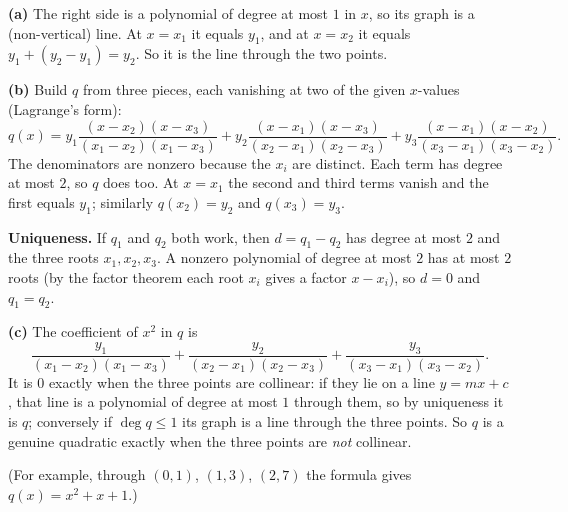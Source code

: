 \textbf{(a)} The right side is a polynomial of degree at most $1$ in $x$, so its graph is a (non-vertical) line. At $x=x_1$ it equals $y_1$, and at $x=x_2$ it equals $y_1+(y_2-y_1)=y_2$. So it is the line through the two points.

\textbf{(b)} Build $q$ from three pieces, each vanishing at two of the given $x$-values (Lagrange's form):
\[q(x)=y_1\dfrac{(x-x_2)(x-x_3)}{(x_1-x_2)(x_1-x_3)}+y_2\dfrac{(x-x_1)(x-x_3)}{(x_2-x_1)(x_2-x_3)}+y_3\dfrac{(x-x_1)(x-x_2)}{(x_3-x_1)(x_3-x_2)}.\]
The denominators are nonzero because the $x_i$ are distinct. Each term has degree at most $2$, so $q$ does too. At $x=x_1$ the second and third terms vanish and the first equals $y_1$; similarly $q(x_2)=y_2$ and $q(x_3)=y_3$.

\textbf{Uniqueness.} If $q_1$ and $q_2$ both work, then $d=q_1-q_2$ has degree at most $2$ and the three roots $x_1,x_2,x_3$. A nonzero polynomial of degree at most $2$ has at most $2$ roots (by the factor theorem each root $x_i$ gives a factor $x-x_i$), so $d=0$ and $q_1=q_2$.

\textbf{(c)} The coefficient of $x^2$ in $q$ is
\[\dfrac{y_1}{(x_1-x_2)(x_1-x_3)}+\dfrac{y_2}{(x_2-x_1)(x_2-x_3)}+\dfrac{y_3}{(x_3-x_1)(x_3-x_2)}.\]
It is $0$ exactly when the three points are collinear: if they lie on a line $y=mx+c$, that line is a polynomial of degree at most $1$ through them, so by uniqueness it is $q$; conversely if $\deg q\le1$ its graph is a line through the three points. So $q$ is a genuine quadratic exactly when the three points are \emph{not} collinear.

(For example, through $(0,1)$, $(1,3)$, $(2,7)$ the formula gives $q(x)=x^2+x+1$.)
